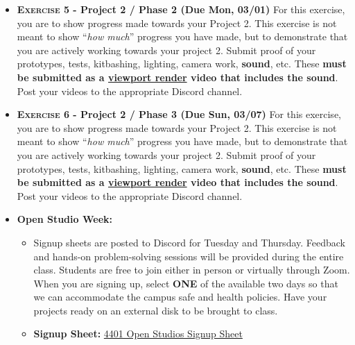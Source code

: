 \def\dMon{Mon, 03/01}
\def\dTues{Tues, 03/02}
\def\dWed{Wed, 03/03}
\def\dThur{Thur, 03/04}
\def\dFri{Fri, 03/05}
\def\dSat{Sat, 03/06}
\def\dSun{Sun, 03/07}
\placeDate

\begin{itemize}[noitemsep,topsep=0pt,leftmargin=*]
    \item \textbf{\textsc{Exercise 5} - Project 2 / Phase 2 (Due \dMon)} For this exercise, you are to show progress made towards your Project 2. This exercise is not meant to show ``\emph{how much}'' progress you have made, but to demonstrate that you are actively working towards your project 2. Submit proof of your prototypes, tests, kitbashing, lighting, camera work, \textbf{sound}, etc. These \textbf{must be submitted as a \href{https://docs.blender.org/manual/en/latest/editors/3dview/viewport_render.html}{viewport render} video that includes the sound}. Post your videos to the appropriate Discord channel.

    \item \textbf{\textsc{Exercise 6} - Project 2 / Phase 3 (Due \dSun)} For this exercise, you are to show progress made towards your Project 2. This exercise is not meant to show ``\emph{how much}'' progress you have made, but to demonstrate that you are actively working towards your project 2. Submit proof of your prototypes, tests, kitbashing, lighting, camera work, \textbf{sound}, etc. These \textbf{must be submitted as a \href{https://docs.blender.org/manual/en/latest/editors/3dview/viewport_render.html}{viewport render} video that includes the sound}. Post your videos to the appropriate Discord channel.
    \item \textcolor{defaultColor}{\textbf{Open Studio Week:}}
          \begin{itemize}
              \item Signup sheets are posted to Discord for Tuesday and Thursday. Feedback and hands-on problem-solving sessions will be provided during the entire class. Students are free to join either in person or virtually through Zoom. When you are signing up, select \textbf{ONE} of the available two days so that we can accommodate the campus safe and health policies.  Have your projects ready on an external disk to be brought to class.
              \item \textbf{Signup Sheet:} \href{https://docs.google.com/spreadsheets/d/1ipdRdrNSbPkMpchORybS6Fx0hvsXnFQzyQ64Ml3oH3A/edit?usp=sharing}{4401 Open Studios Signup Sheet}
          \end{itemize}
\end{itemize}